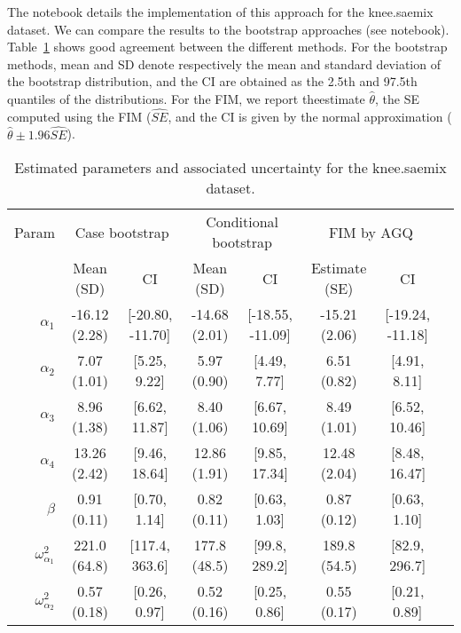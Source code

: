 The notebook details the implementation of this approach for the {\sf knee.saemix} dataset. We can compare the results to the bootstrap approaches (see notebook). Table~\ref{tab:kneeSE} shows good agreement between the different methods. For the bootstrap methods, mean and SD denote respectively the mean and standard deviation of the bootstrap distribution, and the CI are obtained as the 2.5th and 97.5th quantiles of the distributions. For the FIM, we report the\monolix estimate $\hat{\theta}$, the SE computed using the FIM ($\hat{SE}$, and the CI is given by the normal approximation ($\hat{\theta} \pm 1.96 \hat{SE}$).

\begin{table}[ht]
\centering
\begin{tabular}{rccccccc}
  \hline
    Param & \multicolumn{2}{c}{Case bootstrap} & \multicolumn{2}{c}{Conditional bootstrap}  & \multicolumn{2}{c}{FIM by AGQ} \\
 & Mean (SD) & CI & Mean (SD) & CI & Estimate (SE) & CI \\ 
  \hline
$\alpha_1$ & -16.12 (2.28) & [-20.80, -11.70] & -14.68 (2.01) & [-18.55, -11.09] & -15.21 (2.06) & [-19.24, -11.18] \\ 
  $\alpha_2$ &  7.07 (1.01) & [5.25, 9.22] &   5.97 (0.90) & [4.49, 7.77] &   6.51 (0.82) & [4.91, 8.11] \\ 
  $\alpha_3$ &   8.96 (1.38) & [6.62, 11.87] &   8.40 (1.06) & [6.67, 10.69] &   8.49 (1.01) & [6.52, 10.46] \\ 
  $\alpha_4$ &  13.26 (2.42) & [9.46, 18.64] &  12.86 (1.91) & [9.85, 17.34] &  12.48 (2.04) & [8.48, 16.47] \\ 
  $\beta$ &  0.91 (0.11) & [0.70, 1.14] &   0.82 (0.11) & [0.63, 1.03] &   0.87 (0.12) & [0.63, 1.10] \\ 
  $\omega^2_{\alpha_1}$ & 221.0 (64.8) & [117.4, 363.6] & 177.8 (48.5) & [99.8, 289.2] & 189.8 (54.5) & [82.9, 296.7] \\ 
  $\omega^2_{\alpha_2}$ & 0.57 (0.18) & [0.26, 0.97] &   0.52 (0.16) & [0.25, 0.86] &   0.55 (0.17) & [0.21, 0.89] \\ 
   \hline
\end{tabular}
\caption{Estimated parameters and associated uncertainty for the {\sf knee.saemix} dataset.} \label{tab:kneeSE}
\end{table}

